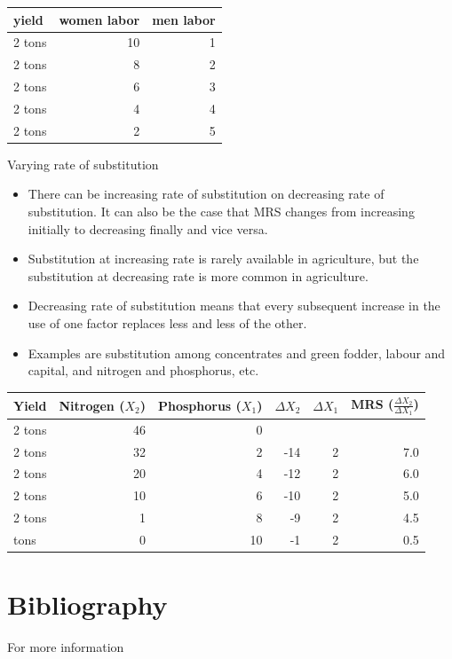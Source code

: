 \documentclass[12pt,ignorenonframetext,aspectratio=169]{beamer}
\providecommand{\tightlist}{%
  \setlength{\itemsep}{0pt}\setlength{\parskip}{0pt}}
\begin{document}
\begin{frame}{}
\protect\hypertarget{section-3}{}
\begin{table}[H]
\centering
\begin{tabular}{lrr}
\toprule
yield & women labor & men labor\\
\midrule
\rowcolor{gray!6}  2 tons & 10 & 1\\
2 tons & 8 & 2\\
\rowcolor{gray!6}  2 tons & 6 & 3\\
2 tons & 4 & 4\\
\rowcolor{gray!6}  2 tons & 2 & 5\\
\bottomrule
\end{tabular}
\end{table}
\end{frame}

\begin{frame}{Varying rate of substitution}
\protect\hypertarget{varying-rate-of-substitution}{}
\begin{itemize}
\tightlist
\item
  There can be increasing rate of substitution on decreasing rate of
  substitution. It can also be the case that MRS changes from increasing
  initially to decreasing finally and vice versa.
\item
  Substitution at increasing rate is rarely available in agriculture,
  but the substitution at decreasing rate is more common in agriculture.
\item
  Decreasing rate of substitution means that every subsequent increase
  in the use of one factor replaces less and less of the other.
\item
  Examples are substitution among concentrates and green fodder, labour
  and capital, and nitrogen and phosphorus, etc.
\end{itemize}
\end{frame}

\begin{frame}{}
\protect\hypertarget{section-4}{}
\begin{table}[H]
\centering
\begin{tabular}{lrrrrr}
\toprule
Yield & Nitrogen ($X_2$) & Phosphorus ($X_1$) & $\Delta X_2$ & $\Delta X_1$ & MRS ($\frac{\Delta X_2}{\Delta X_1}$)\\
\midrule
\rowcolor{gray!6}  2 tons & 46 & 0 &  &  & \\
2 tons & 32 & 2 & -14 & 2 & 7.0\\
\rowcolor{gray!6}  2 tons & 20 & 4 & -12 & 2 & 6.0\\
2 tons & 10 & 6 & -10 & 2 & 5.0\\
\rowcolor{gray!6}  2 tons & 1 & 8 & -9 & 2 & 4.5\\
\addlinespace
2 tons & 0 & 10 & -1 & 2 & 0.5\\
\bottomrule
\end{tabular}
\end{table}
\end{frame}

\hypertarget{bibliography}{%
\section{Bibliography}\label{bibliography}}

\begin{frame}{For more information}
\protect\hypertarget{for-more-information}{}
\end{frame}
\end{document}
